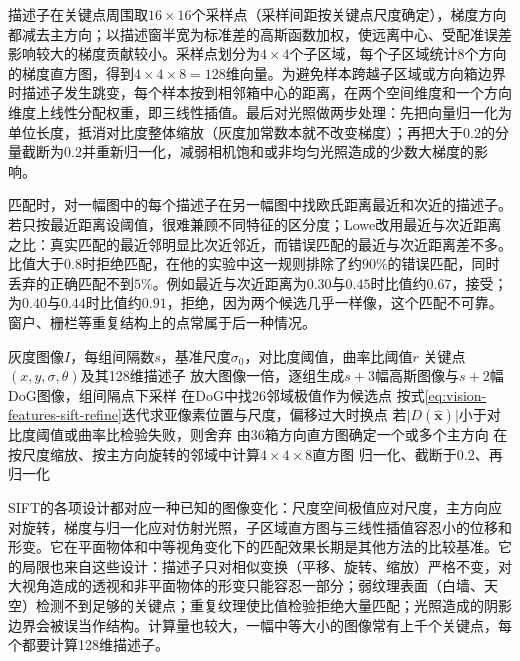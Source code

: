 描述子在关键点周围取$16\times16$个采样点（采样间距按关键点尺度确定），梯度方向都减去主方向；以描述窗半宽为标准差的高斯函数加权，使远离中心、受配准误差影响较大的梯度贡献较小。采样点划分为$4\times4$个子区域，每个子区域统计8个方向的梯度直方图，得到$4\times4\times8=128$维向量。为避免样本跨越子区域或方向箱边界时描述子发生跳变，每个样本按到相邻箱中心的距离，在两个空间维度和一个方向维度上线性分配权重，即三线性插值。最后对光照做两步处理：先把向量归一化为单位长度，抵消对比度整体缩放（灰度加常数本就不改变梯度）；再把大于$0.2$的分量截断为$0.2$并重新归一化，减弱相机饱和或非均匀光照造成的少数大梯度的影响。

匹配时，对一幅图中的每个描述子在另一幅图中找欧氏距离最近和次近的描述子。若只按最近距离设阈值，很难兼顾不同特征的区分度；Lowe改用最近与次近距离之比：真实匹配的最近邻明显比次近邻近，而错误匹配的最近与次近距离差不多。比值大于$0.8$时拒绝匹配，在他的实验中这一规则排除了约$90\%$的错误匹配，同时丢弃的正确匹配不到$5\%$。例如最近与次近距离为$0.30$与$0.45$时比值约$0.67$，接受；为$0.40$与$0.44$时比值约$0.91$，拒绝，因为两个候选几乎一样像，这个匹配不可靠。窗户、栅栏等重复结构上的点常属于后一种情况。

\begin{algorithm}[SIFT特征提取]
  \label{alg:vision-features-sift}
  \begin{algorithmic}[1]
    \Require 灰度图像$I$，每组间隔数$s$，基准尺度$\sigma_0$，对比度阈值，曲率比阈值$r$
    \Ensure 关键点$(x,y,\sigma,\theta)$及其128维描述子
    \State 放大图像一倍，逐组生成$s+3$幅高斯图像与$s+2$幅DoG图像，组间隔点下采样
    \State 在DoG中找26邻域极值作为候选点
      \State 按式\eqref{eq:vision-features-sift-refine}迭代求亚像素位置与尺度，偏移过大时换点
      \State 若$\lvert D(\hat{\bm x})\rvert$小于对比度阈值或曲率比检验失败，则舍弃
      \State 由36箱方向直方图确定一个或多个主方向
      \State 在按尺度缩放、按主方向旋转的邻域中计算$4\times4\times8$直方图
      \State 归一化、截断于$0.2$、再归一化
    \EndFor
  \end{algorithmic}
\end{algorithm}

SIFT的各项设计都对应一种已知的图像变化：尺度空间极值应对尺度，主方向应对旋转，梯度与归一化应对仿射光照，子区域直方图与三线性插值容忍小的位移和形变。它在平面物体和中等视角变化下的匹配效果长期是其他方法的比较基准。它的局限也来自这些设计：描述子只对相似变换（平移、旋转、缩放）严格不变，对大视角造成的透视和非平面物体的形变只能容忍一部分；弱纹理表面（白墙、天空）检测不到足够的关键点；重复纹理使比值检验拒绝大量匹配；光照造成的阴影边界会被误当作结构。计算量也较大，一幅中等大小的图像常有上千个关键点，每个都要计算128维描述子。

